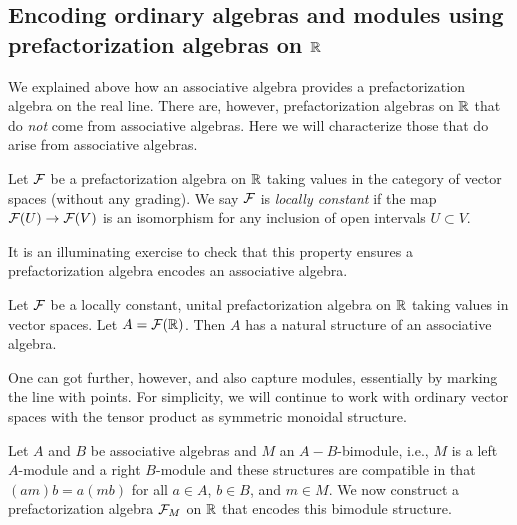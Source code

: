 \documentclass[11pt]{amsart}
\begin{document}
\subsection{Encoding ordinary algebras and modules using prefactorization algebras on $\mathbb R$}
\label{AssAsFact}

We explained above how an associative algebra provides a prefactorization algebra on the real line. There are, however, prefactorization algebras on $\mathbb R$ that do {\em not} come from associative algebras. Here we will characterize those that do arise from associative algebras.
 
\begin{dfn}
Let $\mathcal F$ be a prefactorization algebra on $\mathbb R$ taking values in the category of vector spaces (without any grading).   
We say $\mathcal F$ is \emph{locally constant} if the map $\mathcal F(U) \to \mathcal F(V)$ is an isomorphism for any  inclusion of open intervals $U \subset V$. 
\end{dfn}

It is an illuminating exercise to check that this property ensures a prefactorization algebra encodes an associative algebra.

\begin{lem}\label{locally_constant_is_associative}
Let $\mathcal F$ be a locally constant, unital prefactorization algebra on $\mathbb R$ taking values in vector spaces. 
Let $A = \mathcal F(\mathbb R)$. Then $A$ has a natural structure of an associative algebra.  
\end{lem}

One can got further, however, and also capture modules, essentially by marking the line with points.
For simplicity, we will continue to work with ordinary vector spaces with the tensor product as symmetric monoidal structure.

Let $A$ and $B$ be associative algebras and $M$ an $A-B$-bimodule, i.e., $M$ is a left $A$-module and a right $B$-module and these structures are compatible in that $(am)b = a(mb)$ for all $a \in A$, $b \in B$, and $m \in M$. 
We now construct a prefactorization algebra $\mathcal F_M$ on $\mathbb R$ that encodes this bimodule structure. 
\end{document}
